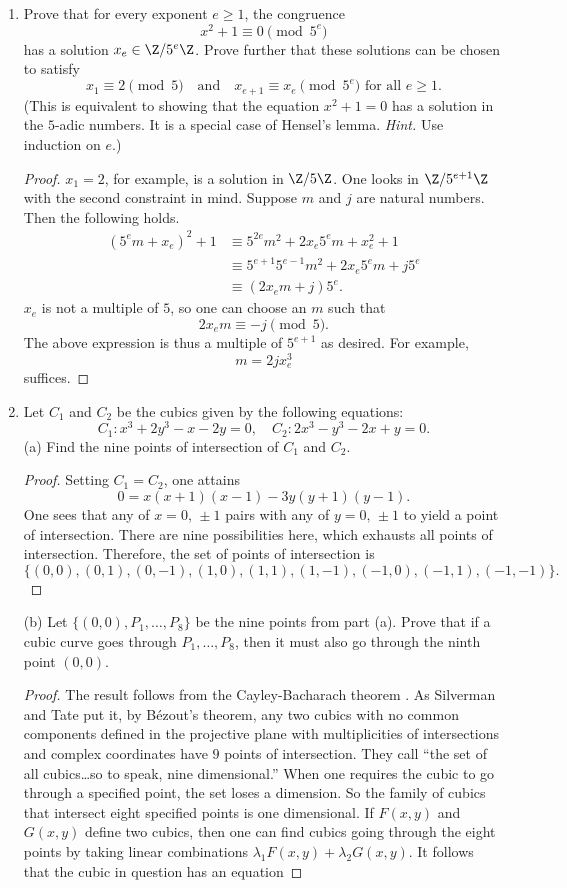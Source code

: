 \documentclass[11pt, oneside]{article}
\begin{document}
\begin{enumerate}
(c)\qquad $3x^2+6y^2=4$
\begin{proof}
One notices that since $18\equiv 2$ is not a quadratic residue modulo $4$, the conic in question has no rational points. 
\end{proof}
\item Prove that for every exponent $e\ge  1$, the congruence
$$
x^2+1\equiv 0\pmod{5^e}
$$
has a solution $x_e\in \Z/5^e\Z$. Prove further that these solutions can be chosen to satisfy
$$
x_1 \equiv 2\pmod 5 \quad \textrm{and}\quad x_{e+1} \equiv x_e \pmod {5^e} \textrm { for all } e \ge  1.
$$
(This is equivalent to showing that the equation $x^2+1=0$ has a solution in the $5$-adic numbers. It is a special case of Hensel's lemma. \textit{Hint.} Use induction on $e$.)
\begin{proof}
$x_1=2$, for example, is a solution in $\Z/5\Z$. One looks in $\Z/5^{e+1}\Z$ with the second constraint in mind. Suppose $m$ and $j$ are natural numbers. Then the following holds.
\begin{align*}
(5^em+x_e)^2 +1 	&\equiv 5^{2e}m^2+2x_e5^em+x^2_e + 1\\
				&\equiv 5^{e+1}5^{e-1}m^2 + 2x_e5^em+j5^e\\
				&\equiv (2x_em+j)5^e.
\end{align*}
$x_e$ is not a multiple of $5$, so one can choose an $m$ such that 
$$
2x_em\equiv -j\pmod {5}.
$$
The above expression is thus a multiple of $5^{e+1}$ as desired. For example,
$$
m=2jx_e^3
$$
suffices.
\end{proof}
\item Let $C_1$ and $C_2$ be the cubics given by the following equations:
$$
C_1 : x^3+2y^3-x-2y=0,\quad C_2:2x^3-y^3-2x+y=0.
$$
(a) Find the nine points of intersection of $C_1$ and $C_2$.
\begin{proof}
Setting $C_1=C_2$, one attains
$$
0 = x(x+1)(x-1) - 3y (y+1)(y-1).
$$
One sees that any of $x=0,\,\pm 1$ pairs with any of $y=0,\,\pm 1$ to yield a point of intersection. There are nine possibilities here, which exhausts all points of intersection. Therefore, the set of points of intersection is 
$$
\{(0,0),  (0,1),  (0,-1),  (1,0),  (1,1), (1,-1),  (-1,0), (-1,1), (-1,-1)\}.
$$
\end{proof}
(b) Let $\{ (0,0), P_1, \hdots, P_8 \}$ be the nine points from part (a). Prove that if a cubic curve goes through $P_1,\hdots,P_8$, then it must also go through the ninth point $(0,0)$.
\begin{proof}
The result follows from the Cayley-Bacharach theorem \cite{tao}. As Silverman and Tate put it, by B\'ezout's theorem, any two cubics with no common components defined in the projective plane with multiplicities of intersections and complex coordinates have $9$ points of intersection. They call ``the set of all cubics\ldots so to speak, nine dimensional.'' When one requires the cubic to go through a specified point, the set loses a dimension. So the family of cubics that intersect eight specified points is one dimensional. If $F(x,y)$ and $G(x,y)$ define two cubics, then one can find cubics going through the eight points by taking linear combinations $\lambda_1F(x,y) +\lambda_2G(x,y)$. It follows that the cubic in question has an equation 

\end{proof}
\end{enumerate}
\end{document}
